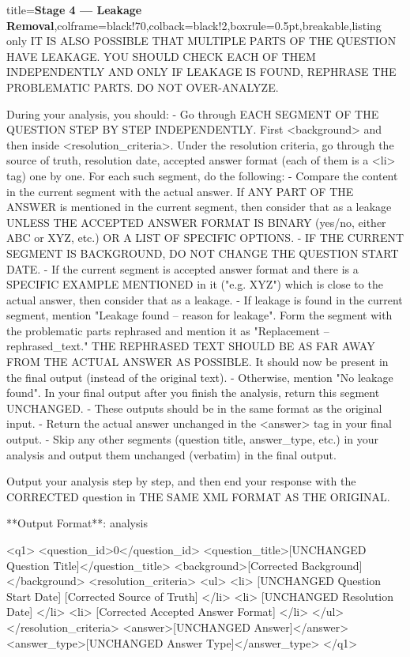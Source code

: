 \documentclass{article} %
\begin{document}
\begin{tcblisting}{title={\textbf{Stage 4 --- Leakage Removal}},colframe=black!70,colback=black!2,boxrule=0.5pt,breakable,listing only}
IT IS ALSO POSSIBLE THAT MULTIPLE PARTS OF THE QUESTION HAVE LEAKAGE. YOU SHOULD CHECK EACH OF THEM INDEPENDENTLY AND ONLY IF LEAKAGE IS FOUND, REPHRASE THE PROBLEMATIC PARTS. DO NOT OVER-ANALYZE.

During your analysis, you should:
- Go through EACH SEGMENT OF THE QUESTION STEP BY STEP INDEPENDENTLY. First <background> and then inside <resolution_criteria>. Under the resolution criteria, go through the source of truth, resolution date, accepted answer format (each of them is a <li> tag) one by one. For each such segment, do the following:
    - Compare the content in the current segment with the actual answer. If ANY PART OF THE ANSWER is mentioned in the current segment, then consider that as a leakage UNLESS THE ACCEPTED ANSWER FORMAT IS BINARY (yes/no, either ABC or XYZ, etc.) OR A LIST OF SPECIFIC OPTIONS.
    - IF THE CURRENT SEGMENT IS BACKGROUND, DO NOT CHANGE THE QUESTION START DATE.
    - If the current segment is accepted answer format and there is a SPECIFIC EXAMPLE MENTIONED in it ("e.g. XYZ") which is close to the actual answer, then consider that as a leakage.
    - If leakage is found in the current segment, mention "Leakage found -- {{reason for leakage}}". Form the segment with the problematic parts rephrased and mention it as "Replacement -- {{rephrased_text}}." THE REPHRASED TEXT SHOULD BE AS FAR AWAY FROM THE ACTUAL ANSWER AS POSSIBLE. It should now be present in the final output (instead of the original text).
    - Otherwise, mention "No leakage found". In your final output after you finish the analysis, return this segment UNCHANGED.
    - These outputs should be in the same format as the original input. 
- Return the actual answer unchanged in the <answer> tag in your final output.
- Skip any other segments (question title, answer_type, etc.) in your analysis and output them unchanged (verbatim) in the final output.

Output your analysis step by step, and then end your response with the CORRECTED question in THE SAME XML FORMAT AS THE ORIGINAL. 

**Output Format**:
{{ analysis }}

<q1>
<question_id>0</question_id>
<question_title>[UNCHANGED Question Title]</question_title>
<background>[Corrected Background]</background>
<resolution_criteria>
<ul>
    <li> [UNCHANGED Question Start Date] [Corrected Source of Truth] </li>
    <li> [UNCHANGED Resolution Date] </li>
    <li> [Corrected Accepted Answer Format] </li>
</ul>
</resolution_criteria>
<answer>[UNCHANGED Answer]</answer>
<answer_type>[UNCHANGED Answer Type]</answer_type>
</q1>
\end{tcblisting}
\end{document}
